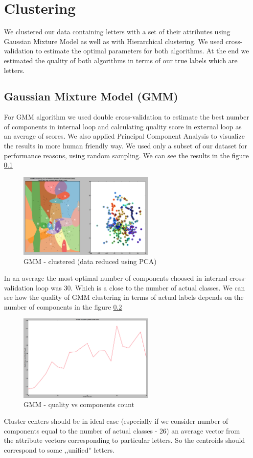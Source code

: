 \chapter*{Clustering}
We clustered our data containing letters with a set of their attributes using
Gaussian Mixture Model as well as with Hierarchical clustering. We used
cross-validation to estimate the optimal parameters for both algorithms. At
the end we estimated the quality of both algorithms in terms of our true labels
which are letters.


\section{Gaussian Mixture Model (GMM)}
For GMM algorithm we used double cross-validation to estimate the best number of
components in internal loop and calculating quality score in external loop as
an average of scores. We also applied Principal Component Analysis to visualize
the results in more human friendly way. We used only a subset of our dataset for
performance reasons, using random sampling. We can see the results in the figure
\ref{fig:GMM}
\begin{figure}[!tbh]
  \centering
  \includegraphics[width=0.6\textwidth]{figures/GMM_pca_2_2}
  \caption{GMM - clustered (data reduced using PCA)}
  \label{fig:GMM}
\end{figure}
In an average the most optimal number of components choosed in internal
cross-validation loop was 30. Which is a close to the number of actual classes.
We can see how the quality of GMM clustering in terms of actual labels depends
on the number of components in the figure \ref{fig:ami}
\begin{figure}[!tbh]
  \centering
  \includegraphics[width=0.6\textwidth]{figures/ami}
  \caption{GMM - quality vs components count}
  \label{fig:ami}
\end{figure}
Cluster centers should be in ideal case (especially if we consider number of
components equal to the number of actual classes - 26) an average vector from
the attribute vectors corresponding to particular letters. So the centroids
should correspond to some ,,unified'' letters.

